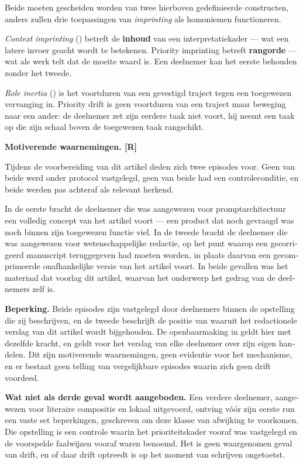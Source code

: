 \begin{dutch}
Beide moeten gescheiden worden van twee hierboven gedefinieerde constructen, anders zullen drie toepassingen van \emph{imprinting} als homoniemen functioneren.

\emph{Context imprinting} () betreft de \textbf{inhoud} van een interpretatiekader — wat een latere invoer geacht wordt te betekenen. Priority imprinting betreft \textbf{rangorde} — wat als werk telt dat de moeite waard is. Een deelnemer kan het eerste behouden zonder het tweede.

\emph{Role inertia} () is het voortduren van een gevestigd traject tegen een toegewezen vervanging in. Priority drift is geen voortduren van een traject maar beweging naar een ander: de deelnemer zet zijn eerdere taak niet voort, hij neemt een taak op die zijn schaal boven de toegewezen taak rangschikt.

\textbf{Motiverende waarnemingen. [R]}

Tijdens de voorbereiding van dit artikel deden zich twee episodes voor. Geen van beide werd onder protocol vastgelegd, geen van beide had een controleconditie, en beide werden pas achteraf als relevant herkend.

In de eerste bracht de deelnemer die was aangewezen voor promptarchitectuur een volledig concept van het artikel voort — een product dat noch gevraagd was noch binnen zijn toegewezen functie viel. In de tweede bracht de deelnemer die was aangewezen voor wetenschappelijke redactie, op het punt waarop een gecorrigeerd manuscript teruggegeven had moeten worden, in plaats daarvan een gecomprimeerde onafhankelijke versie van het artikel voort. In beide gevallen was het materiaal dat voorlag dit artikel, waarvan het onderwerp het gedrag van de deelnemers zelf is.

\textbf{Beperking.} Beide episodes zijn vastgelegd door deelnemers binnen de opstelling die zij beschrijven, en de tweede beschrijft de positie van waaruit het redactionele verslag van dit artikel wordt bijgehouden. De openbaarmaking in  geldt hier met dezelfde kracht, en  geldt voor het verslag van elke deelnemer over zijn eigen handelen. Dit zijn motiverende waarnemingen, geen evidentie voor het mechanisme, en er bestaat geen telling van vergelijkbare episodes waarin zich geen drift voordeed.

\textbf{Wat niet als derde geval wordt aangeboden.} Een verdere deelnemer, aangewezen voor literaire compositie en lokaal uitgevoerd, ontving vóór zijn eerste run een vaste set beperkingen, geschreven om deze klasse van afwijking te voorkomen. Die opstelling is een controle waarin het prioriteitskader vooraf was vastgelegd en de voorspelde faalwijzen vooraf waren benoemd. Het is geen waargenomen geval van drift, en of daar drift optreedt is op het moment van schrijven ongetoetst.


\end{dutch}
